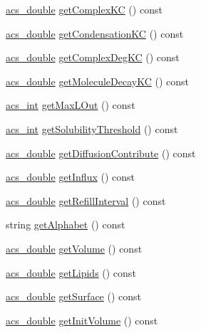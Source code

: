 \begin{DoxyCompactItemize}
\item 
\hyperlink{a00024_ab776853a005fcbf56af0424a2a4dd607}{acs\-\_\-double} \hyperlink{a00011_abf3168adf05ff9fa6bab4e34b387f0a6}{get\-Complex\-K\-C} () const 
\item 
\hyperlink{a00024_ab776853a005fcbf56af0424a2a4dd607}{acs\-\_\-double} \hyperlink{a00011_a7ac1b69dd38107d5c40339563969d09f}{get\-Condensation\-K\-C} () const 
\item 
\hyperlink{a00024_ab776853a005fcbf56af0424a2a4dd607}{acs\-\_\-double} \hyperlink{a00011_ae58bcd60ae01a8ba12f83c1328121c35}{get\-Complex\-Deg\-K\-C} () const 
\item 
\hyperlink{a00024_ab776853a005fcbf56af0424a2a4dd607}{acs\-\_\-double} \hyperlink{a00011_a4ed6ad35297e718398fb42a2b9dbe4ae}{get\-Molecule\-Decay\-K\-C} () const 
\item 
\hyperlink{a00024_a8d277355641a098190360234e2ebde35}{acs\-\_\-int} \hyperlink{a00011_a4c58b3ce555f04f009bcfb7bbc2b0000}{get\-Max\-L\-Out} () const 
\item 
\hyperlink{a00024_a8d277355641a098190360234e2ebde35}{acs\-\_\-int} \hyperlink{a00011_a6df38337d38f2f714be7058a2a31202c}{get\-Solubility\-Threshold} () const 
\item 
\hyperlink{a00024_ab776853a005fcbf56af0424a2a4dd607}{acs\-\_\-double} \hyperlink{a00011_a46193e153bd5dcc37fb35346cb7fd971}{get\-Diffusion\-Contribute} () const 
\item 
\hyperlink{a00024_ab776853a005fcbf56af0424a2a4dd607}{acs\-\_\-double} \hyperlink{a00011_a6f0b4481779cd12dbcd8155916c7d703}{get\-Influx} () const 
\item 
\hyperlink{a00024_ab776853a005fcbf56af0424a2a4dd607}{acs\-\_\-double} \hyperlink{a00011_a469a7ce80a1e9e5fae77b46b66dfee18}{get\-Refill\-Interval} () const 
\item 
string \hyperlink{a00011_add8478cfc878c3aa5a57b2a71357a088}{get\-Alphabet} () const 
\item 
\hyperlink{a00024_ab776853a005fcbf56af0424a2a4dd607}{acs\-\_\-double} \hyperlink{a00011_a355b53cbc86aaab2a6d114980162ac0e}{get\-Volume} () const 
\item 
\hyperlink{a00024_ab776853a005fcbf56af0424a2a4dd607}{acs\-\_\-double} \hyperlink{a00011_a99dbdcc260e6216741a1d9b9a36855f2}{get\-Lipids} () const 
\item 
\hyperlink{a00024_ab776853a005fcbf56af0424a2a4dd607}{acs\-\_\-double} \hyperlink{a00011_af2518db60035d2ab06a158164d86d156}{get\-Surface} () const 
\item 
\hyperlink{a00024_ab776853a005fcbf56af0424a2a4dd607}{acs\-\_\-double} \hyperlink{a00011_a3257b9ae05d12b11ffa40258acfa10a8}{get\-Init\-Volume} () const 

\end{DoxyCompactItemize}
